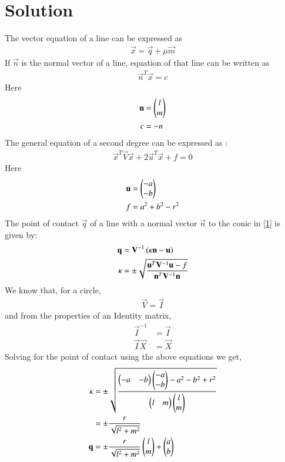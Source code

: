 \documentclass[journal,12pt,twocolumn]{IEEEtran}
\begin{document}
\section*{Solution}
The vector equation of a line can be expressed as 
\begin{align}
    \vec{x} = \vec{q} +\mu\vec{m}
\end{align}
If $\vec{n}$ is the normal vector of a line, equation of that line can be written as 
\begin{align}
    \vec{n}^T\vec{x} = c 
\end{align}
Here
\begin{align}
    \mathbf{n} &= \begin{pmatrix}l \\ m\end{pmatrix}\\
    c&=-n
\end{align}
The general equation of a second degree can be expressed as :
\begin{align}
    \vec{x}^T\vec{V}\vec{x}+2\vec{u}^T\vec{x}+f=0\label{1}
\end{align}
Here
\begin{align}
    \mathbf{u}&=\begin{pmatrix}-a \\ -b\end{pmatrix}\\
    f&=a^2+b^2-r^2
\end{align}
The point of contact $\vec{q}$ of a line with a normal vector $\vec{n}$ to the conic in \eqref{1} is given by:
\begin{align}
    \mathbf{q} &= \mathbf{V}^{-1}\left(\kappa \mathbf{n}-\mathbf{u}\right)\\
    \kappa &= \pm \sqrt{\frac{\mathbf{u}^T\mathbf{V}^{-1}\mathbf{u}-f}{\mathbf{n}^T\mathbf{V}^{-1}\mathbf{n}}} \label{eq:solutions/4/2/8/eq4}
\end{align}
We know that, for a circle, 
\begin{align}
    \vec{V} = \vec{I}
\end{align}
and from the properties of an Identity matrix, 
\begin{align}
    \vec{I}^{-1} &= \vec{I} \\
    \vec{I}\vec{X} &= \vec{X}   
\end{align}
Solving for the point of contact using the above equations we get,
\begin{align}
    \kappa &= \pm \sqrt{\frac{\begin{pmatrix} -a & -b\end{pmatrix}\begin{pmatrix}-a \\ -b\end{pmatrix} - a^2-b^2+r^2}{\begin{pmatrix}l & m \end{pmatrix}\begin{pmatrix}l \\ m \end{pmatrix}}} \\
    &= \pm \frac{r}{\sqrt{l^2+m^2}} \\
    \mathbf{q}&=\pm\frac{r}{\sqrt{l^2+m^2}}\begin{pmatrix}l\\m\end{pmatrix}+\begin{pmatrix}a\\b\end{pmatrix}\\
\end{align}
\end{document}
